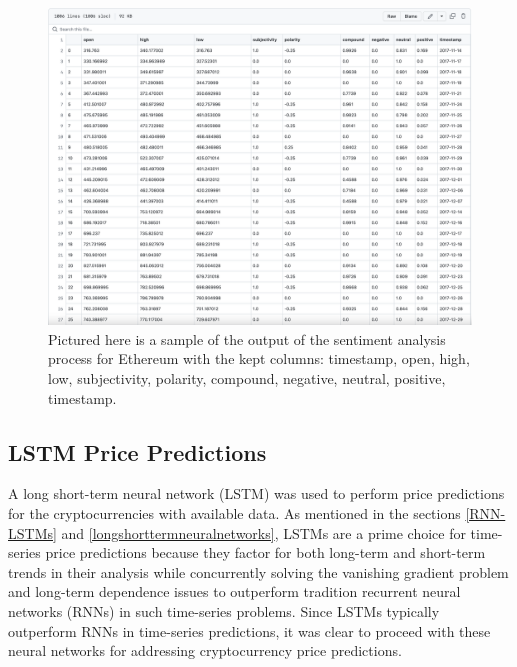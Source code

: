 \documentclass[10pt,twocolumn]{article}
\begin{document}
\begin{figure}
    \centering
    \includegraphics[scale=0.18]{images/ethereum-sample-sentiment-analysis-output.png}
    \caption{
        Pictured here is a sample of the output of the sentiment analysis process for Ethereum with the kept columns: timestamp, open, high, low, subjectivity, polarity, compound, negative, neutral, positive, timestamp.
    }
    \label{sample-sentiment-dataset}
\end{figure}

\subsection{LSTM Price Predictions}

A long short-term neural network (LSTM) was used to perform price predictions for the cryptocurrencies with available data. As mentioned in the sections \ref{RNN-LSTMs} and \ref{longshorttermneuralnetworks}, LSTMs are a prime choice for time-series price predictions because they factor for both long-term and short-term trends in their analysis while concurrently solving the vanishing gradient problem and long-term dependence issues to outperform tradition recurrent neural networks (RNNs) in such time-series problems. Since LSTMs typically outperform RNNs in time-series predictions, it was clear to proceed with these neural networks for addressing cryptocurrency price predictions.
\end{document}
